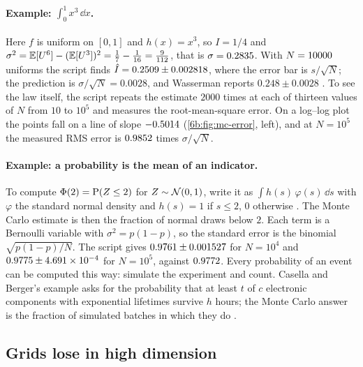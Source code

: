 \paragraph{Example: $\int_0^1x^3\,\dd x$.}
Here $f$ is uniform on $[0,1]$ and $h(x)=x^3$, so $I=1/4$ and
$\sigma^2=\E[U^6]-(\E[U^3])^2=\tfrac17-\tfrac1{16}=\tfrac{9}{112}$, that is
$\sigma=0.2835$. With $N=10000$ uniforms the script finds
$\hat I=0.2509\pm0.002818$, where the error bar is $s/\sqrt N$; the prediction
is $\sigma/\sqrt N=0.0028$, and Wasserman reports $0.248\pm0.0028$
. To see the law itself, the script repeats the estimate $2000$ times at
each of thirteen values of $N$ from $10$ to $10^5$ and measures the root-mean-square
error. On a log--log plot the points fall on a line of slope $-0.5014$
(\cref{6b:fig:mc-error}, left), and at $N=10^5$ the measured RMS error is $0.9852$
times $\sigma/\sqrt N$.

\paragraph{Example: a probability is the mean of an indicator.}
To compute $\Phi(2)=\operatorname{P}(Z\le2)$ for $Z\sim\mathcal{N}(0,1)$, write it as
$\int h(s)\,\varphi(s)\,\dd s$ with $\varphi$ the standard normal density and $h(s)=1$ if $s\le2$,
$0$ otherwise . The Monte Carlo estimate is then the fraction of
normal draws below $2$. Each term is a Bernoulli variable with $\sigma^2=p(1-p)$, so the
standard error is the binomial $\sqrt{p(1-p)/N}$. The script gives $0.9761\pm0.001527$
for $N=10^4$ and $0.9775\pm4.691\times10^{-4}$ for $N=10^5$, against $0.9772$.
Every probability of an event can be computed this way: simulate the experiment and count.
Casella and Berger's example asks for the probability that at least $t$ of $c$ electronic
components with exponential lifetimes survive $h$ hours; the Monte Carlo answer is the
fraction of simulated batches in which they do .

\subsection{Grids lose in high dimension}
\label{6b:sec:grid-vs-mc}

